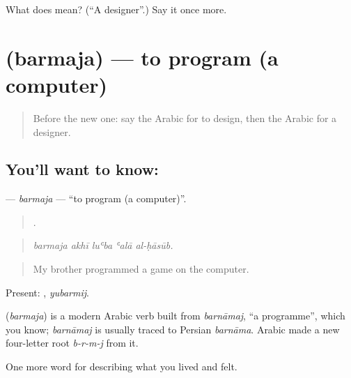 \begin{tcolorbox}[breakable,colback=teal!4,colframe=teal!35!black,title={Before you move on}]
What does  mean? (\textquotedblleft{}A designer\textquotedblright{}.) Say it once more.
\end{tcolorbox}
\section[\texorpdfstring{\ar{برمج} (barmaja)}{برمج (barmaja)}]{ (barmaja) — to program (a computer)}

\label{lesson:AR-C525-barmaja}



\begin{quote}
Before the new one: say the Arabic for to design, then the Arabic for a designer.
\end{quote}

\subsection*{You'll want to know: }
\textbf{} — \emph{barmaja} — \textquotedblleft{}to program (a computer)\textquotedblright{}.

\begin{quote}
    .
\end{quote}

\begin{quote}
\emph{barmaja akhī luʿba ʿalā al-ḥāsūb.}
\end{quote}

\begin{quote}
My brother programmed a game on the computer.
\end{quote}

Present: , \emph{yubarmij}.

\begin{cousinweb}
\textbf{} (\emph{barmaja}) is a modern Arabic verb built from \emph{barnāmaj}, \textquotedblleft{}a programme\textquotedblright{}, which you know; \emph{barnāmaj} is usually traced to Persian \emph{barnāma}. Arabic made a new four-letter root \emph{b-r-m-j} from it.
\end{cousinweb}

\begin{grammarlens}[title={What you've built}]
One more word for describing what you lived and felt.
\end{grammarlens}

